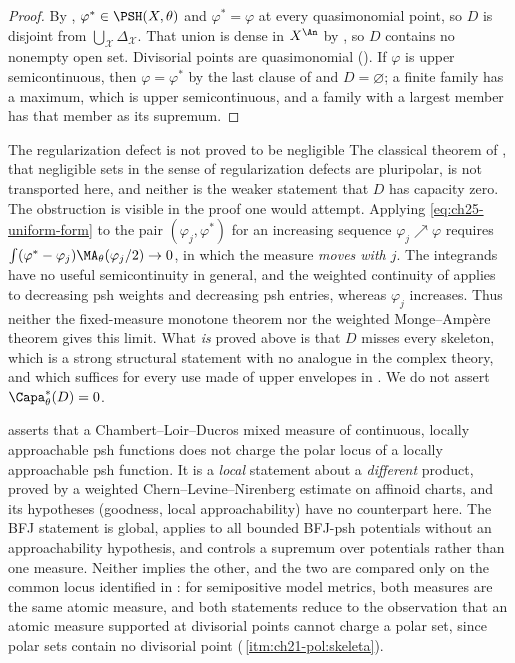 \begin{proof}
By , $\varphi^*\in\PSH(X,\theta)$ and
$\varphi^*=\varphi$ at every quasimonomial point, so $D$ is disjoint
from $\bigcup_{\mathcal X}\Delta_{\mathcal X}$.  That union is dense in
$X^{\An}$ by , so $D$ contains no
nonempty open set.  Divisorial points are quasimonomial
().  If $\varphi$ is upper
semicontinuous, then $\varphi=\varphi^*$ by the last clause of
 and $D=\varnothing$; a finite family has a
maximum, which is upper semicontinuous, and a family with a largest member
has that member as its supremum.
\end{proof}

\begin{warning}{The regularization defect is not proved to be negligible}
The classical theorem of \cite{BT82}, that negligible sets in the sense of
regularization defects are pluripolar, is not transported here, and neither
is the weaker statement that $D$ has capacity zero.  The obstruction is
visible in the proof one would attempt.  Applying
\eqref{eq:ch25-uniform-form} to the pair $(\varphi_j,\varphi^*)$ for an
increasing sequence $\varphi_j\nearrow\varphi$ requires
$\int(\varphi^*-\varphi_j)\MA_\theta(\varphi_j/2)\to0$, in which the
measure \emph{moves with $j$}.  The integrands have no useful
semicontinuity in general, and the weighted continuity of
 applies to decreasing psh weights and
decreasing psh entries, whereas $\varphi_j$ increases.  Thus neither the
fixed-measure monotone theorem nor the weighted Monge--Amp\`ere theorem gives
this limit.  What \emph{is} proved above is that
$D$ misses every skeleton, which is a strong structural statement with no
analogue in the complex theory, and which suffices for every use made of
upper envelopes in .  We do not assert
$\Capa^*_\theta(D)=0$.
\end{warning}

\begin{remark}
\label{rem:ch25-cld-comparison}
 asserts that a Chambert--Loir--Ducros
mixed measure of continuous, locally approachable psh functions does not
charge the polar locus of a locally approachable psh function.  It is a
\emph{local} statement about a \emph{different} product, proved by a weighted
Chern--Levine--Nirenberg estimate on affinoid charts, and its hypotheses
(goodness, local approachability) have no counterpart here.  The BFJ
statement  is global, applies to all bounded
BFJ-psh potentials without an approachability hypothesis, and controls a
supremum over potentials rather than one measure.  Neither implies the other,
and the two are compared only on the common locus identified in
: for semipositive model metrics, both
measures are the same atomic measure, and both statements reduce to the
observation that an atomic measure supported at divisorial points cannot
charge a polar set, since polar sets contain no divisorial point
(\,\cref{itm:ch21-pol:skeleta}).
\end{remark}

